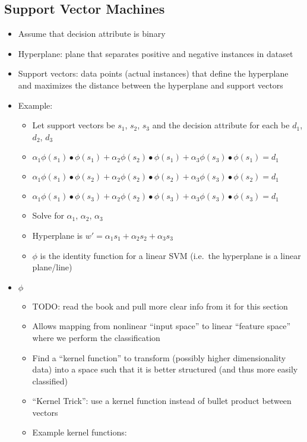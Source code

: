 \documentclass[fontsize=4pt]{scrartcl}
\begin{document}
\begin{multicols}{3}
\subsection{Support Vector Machines}
\begin{itemize}
	\item Assume that decision attribute is binary
	\item Hyperplane: plane that separates positive and negative instances in dataset
	\item Support vectors: data points (actual instances) that define the hyperplane and maximizes the distance between the hyperplane and support vectors
	\item Example:
		\begin{itemize}
			\item Let support vectors be $s_1$, $s_2$, $s_3$ and the decision attribute for each be $d_1$, $d_2$, $d_3$
			\item $\alpha_1 \phi(s_1) \bullet \phi(s_1) + \alpha_2 \phi(s_2) \bullet \phi(s_1) + \alpha_3 \phi(s_3) \bullet \phi(s_1) = d_1$
			\item $\alpha_1 \phi(s_1) \bullet \phi(s_2) + \alpha_2 \phi(s_2) \bullet \phi(s_2) + \alpha_3 \phi(s_3) \bullet \phi(s_2) = d_1$
			\item $\alpha_1 \phi(s_1) \bullet \phi(s_3) + \alpha_2 \phi(s_2) \bullet \phi(s_3) + \alpha_3 \phi(s_3) \bullet \phi(s_3) = d_1$
			\item Solve for $\alpha_1$, $\alpha_2$, $\alpha_3$
			\item Hyperplane is $w' = \alpha_1 s_1 + \alpha_2 s_2 + \alpha_3 s_3$
			\item $\phi$ is the identity function for a linear SVM (i.e.\ the hyperplane is a linear plane/line)
		\end{itemize}
	\item $\phi$
		\begin {itemize}
		  \item TODO: read the book and pull more clear info from it for this section
			\item Allows mapping from nonlinear ``input space'' to linear ``feature space'' where we perform the classification
			\item Find a ``kernel function'' to transform (possibly higher dimensionality data) into a space such that it is better structured (and thus more easily classified)
			\item ``Kernel Trick'': use a kernel function instead of bullet product between vectors
			\item Example kernel functions:

\end{itemize}
\end{itemize}
\end{multicols}
\end{document}

